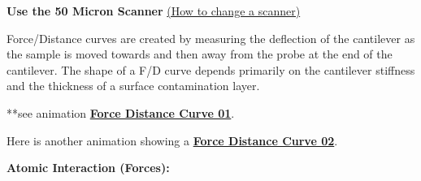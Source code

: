 \documentclass{../lab}
\begin{document}
\textbf{Use the 50 Micron Scanner} \hyperref[subsec:ChangingScanners]{(How to change a scanner)}

Force/Distance curves are created by measuring the deflection of the cantilever as the sample is moved towards and then away from the probe at the end of the cantilever.  The shape of a F/D curve depends primarily on the cantilever stiffness and the thickness of a surface contamination layer.

**see animation \href{http://experimentationlab.berkeley.edu/sites/default/files/AFMImages/Force-distance\_curves\_en\_video.mp4}{\textbf{Force Distance Curve 01}}.

Here is another animation showing a \href{http://experimentationlab.berkeley.edu/sites/default/files/AFMImages/6.1\%20Tip\%20Sample.flv\_converted.mp4}{\textbf{Force Distance Curve 02}}.


\textbf{Atomic Interaction (Forces):}
\end{document}
